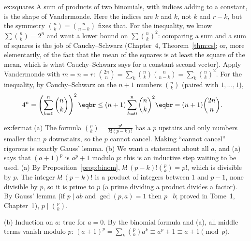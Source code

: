 \begin{solution}{ex:squares}
\idea A sum of products of two binomials, with indices adding to a constant, is the shape of Vandermonde. Here the indices are $k$ and $k$, not $k$ and $r-k$, but the symmetry $\binom nk=\binom n{n-k}$ fixes that. For the inequality, we know $\sum\binom nk=2^n$ and want a lower bound on $\sum\binom nk^2$: comparing a sum and a sum of squares is the job of Cauchy--Schwarz (Chapter~4, Theorem~\ref{thm:cs}; or, more elementarily, of the fact that the mean of the squares is at least the square of the mean, which is what Cauchy--Schwarz says for a constant second vector).
\writeup Apply Vandermonde with $m=n=r$: $\binom{2n}n=\sum_k\binom nk\binom n{n-k}=\sum_k\binom nk^2$.
For the inequality, by Cauchy--Schwarz on the $n+1$ numbers $\binom nk$ (paired with $1,\dots,1$),
\[
\begin{aligned}4^n&=\left(\sum_{k=0}^n\binom nk\right)^2\eqbr\le(n+1)\sum_{k=0}^n\binom nk^2\eqbr=(n+1)\binom{2n}n.\end{aligned}
\]
\end{solution}

\begin{solution}{ex:fermat}
\idea (a) The formula $\binom pk=\frac{p!}{k!(p-k)!}$ has a $p$ upstairs and only numbers smaller than $p$ downstairs, so the $p$ cannot cancel. Making ``cannot cancel'' rigorous is exactly Gauss' lemma. (b) We want a statement about all $a$, and (a) says that $(a+1)^p$ is $a^p+1$ modulo $p$: this is an inductive step waiting to be used.
\writeup (a) By Proposition~\ref{prop:binom}, $k!\,(p-k)!\binom pk=p!$, which is divisible by $p$. The integer $k!\,(p-k)!$ is a product of integers between $1$ and $p-1$, none divisible by $p$, so it is prime to $p$ (a prime dividing a product divides a factor). By Gauss' lemma (if $p\mid ab$ and $\gcd(p,a)=1$ then $p\mid b$; proved in Tome~1, Chapter~1), $p\mid\binom pk$.

(b) Induction on $a$: true for $a=0$. By the binomial formula and (a), all middle terms vanish modulo $p$:
$(a+1)^p=\sum_k\binom pka^k\equiv a^p+1\equiv a+1\pmod p$.
\end{solution}

